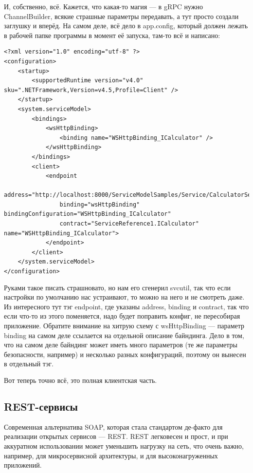 \documentclass[a5paper]{article}
\begin{document}
И, собственно, всё. Кажется, что какая-то магия --- в gRPC нужно ChannelBuilder, всякие страшные параметры передавать, а тут просто создали заглушку и вперёд. На самом деле, всё дело в app.config, который должен лежать в рабочей папке программы в момент её запуска, там-то всё и написано: 

\begin{verbatim}
<?xml version="1.0" encoding="utf-8" ?>  
<configuration>  
    <startup>   
        <supportedRuntime version="v4.0" sku=".NETFramework,Version=v4.5,Profile=Client" />  
    </startup>  
    <system.serviceModel>  
        <bindings>  
            <wsHttpBinding>  
                <binding name="WSHttpBinding_ICalculator" />  
            </wsHttpBinding>  
        </bindings>  
        <client>  
            <endpoint 
                address="http://localhost:8000/ServiceModelSamples/Service/CalculatorService"  
                binding="wsHttpBinding" bindingConfiguration="WSHttpBinding_ICalculator"  
                contract="ServiceReference1.ICalculator" name="WSHttpBinding_ICalculator">  
            </endpoint>  
        </client>  
    </system.serviceModel>  
</configuration>
\end{verbatim}

Руками такое писать страшновато, но нам его сгенерил svcutil, так что если настройки по умолчанию нас устраивают, то можно на него и не смотреть даже. Из интересного тут тэг endpoint, где указаны address, binding и contract, так что если что-то из этого поменяется, надо будет поправить конфиг, не пересобирая приложение. Обратите внимание на хитрую схему с wsHttpBinding --- параметр binding на самом деле ссылается на отдельной описание байндинга. Дело в том, что на самом деле байндинг может иметь много параметров (те же параметры безопасности, например) и несколько разных конфигураций, поэтому он вынесен в отдельный тэг.

Вот теперь точно всё, это полная клиентская часть.

\subsection{REST-сервисы}

Современная альтернатива SOAP, которая стала стандартом де-факто для реализации открытых сервисов --- REST. REST легковесен и прост, и при аккуратном использовании может уменьшить нагрузку на сеть, что очень важно, например, для микросервисной архитектуры, и для высоконагруженных приложений.
\end{document}
